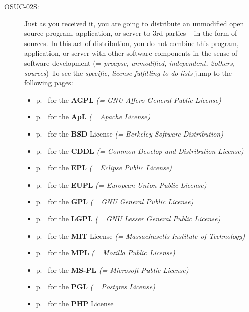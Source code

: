 \begin{description}
\item[OSUC-02S:]\label{OSUC-02S-DEF} Just as you received it, you are going to
distribute an unmodified open source program, application, or server to 3rd
parties -- in the form of sources. In this act of distribution, you do not
combine this program, application, or server with other software components in
the sense of software development (= \textit{proapse, unmodified, independent,
2others, sources}) To see the \textit{specific, license fulfilling to-do lists}
jump to the following pages:
   \begin{itemize}
    \item p.\ \pageref{OSUC-02S-AGPL} for the \textbf{AGPL}
      \textit{(= GNU Affero General Public License)} 
    \item p.\ \pageref{OSUC-02S-Apache20} for the \textbf{ApL}
      \textit{(= Apache License)}
    \item p.\ \pageref{OSUC-02S-BSD} for the \textbf{BSD} License
      \textit{(= Berkeley Software Distribution)}
    \item p.\ \pageref{OSUC-02S-CDDL} for the \textbf{CDDL}
      \textit{(= Common Develop and Distribution License)}  
    \item p.\ \pageref{OSUC-02S-EPL} for the \textbf{EPL}
      \textit{(= Eclipse Public License)}     
    \item p.\ \pageref{OSUC-02S-EUPL} for the \textbf{EUPL}
      \textit{(= European Union Public License)} 
    \item p.\ \pageref{OSUC-02S-GPL} for the \textbf{GPL}
       \textit{(= GNU General Public License)} 
    \item p.\ \pageref{OSUC-02S-LGPL} for the \textbf{LGPL}
      \textit{(= GNU Lesser General Public License)}           
    \item p.\ \pageref{OSUC-02S-MIT} for the \textbf{MIT} License
       \textit{(= Massachusetts Institute of Technology)} 
    \item p.\ \pageref{OSUC-02S-MPL} for the \textbf{MPL}
      \textit{(= Mozilla Public License)}     
    \item p.\ \pageref{OSUC-02S-MS-PL} for the \textbf{MS-PL}
      \textit{(= Microsoft Public License)} 
    \item p.\ \pageref{OSUC-02S-PGL} for the \textbf{PGL}
      \textit{(= Postgres License)} 
    \item p.\ \pageref{OSUC-02S-PHP} for the \textbf{PHP} License 
  \end{itemize}


\end{description}
